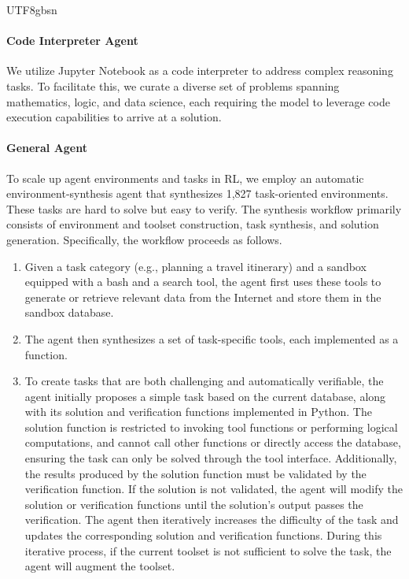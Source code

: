 \documentclass[11pt, a4paper, logo, copyright, nonumbering]{deepseek}
\begin{document}
\begin{CJK*}{UTF8}{gbsn}
\paragraph{Code Interpreter Agent}
We utilize Jupyter Notebook as a code interpreter to address complex reasoning tasks. To facilitate this, we curate a diverse set of problems spanning mathematics, logic, and data science, each requiring the model to leverage code execution capabilities to arrive at a solution.

\paragraph{General Agent}
To scale up agent environments and tasks in RL, we employ an automatic environment-synthesis agent that synthesizes 1,827 task-oriented environments. These tasks are hard to solve but easy to verify. The synthesis workflow primarily consists of environment and toolset construction, task synthesis, and solution generation. Specifically, the workflow proceeds as follows.
\begin{enumerate}
    \item Given a task category (e.g., planning a travel itinerary) and a sandbox equipped with a bash and a search tool, the agent first uses these tools to generate or retrieve relevant data from the Internet and store them in the sandbox database.
    \item The agent then synthesizes a set of task-specific tools, each implemented as a function.
    \item To create tasks that are both challenging and automatically verifiable, the agent initially proposes a simple task based on the current database, along with its solution and verification functions implemented in Python. The solution function is restricted to invoking tool functions or performing logical computations, and cannot call other functions or directly access the database, ensuring the task can only be solved through the tool interface. Additionally, the results produced by the solution function must be validated by the verification function. If the solution is not validated, the agent will modify the solution or verification functions until the solution's output passes the verification. The agent then iteratively increases the difficulty of the task and updates the corresponding solution and verification functions. During this iterative process, if the current toolset is not sufficient to solve the task, the agent will augment the toolset.


\end{enumerate}
\end{CJK*}
\end{document}
